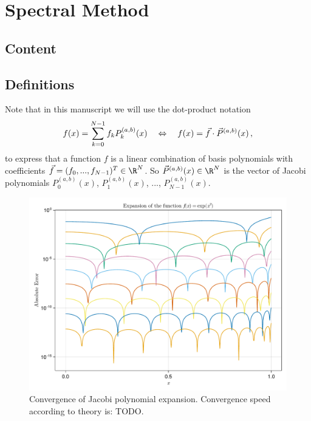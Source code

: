 \chapter{Spectral Method}
\label{chap:spectral-method}

\section{Content}


\section{Definitions}













Note that in this manuscript we will use the dot-product notation
$$f(x) = \sum_{k=0}^{N-1} f_k P_k^{(a, b)}(x) \quad\Leftrightarrow\quad f(x) = \vec{f} \cdot \vec{P}^{(a, b)}(x)\,,$$
to express that a function $f$ is a linear combination of basis polynomials with coefficients $\vec{f} = (f_0, ..., f_{N-1})^T \in \R^N$.
So $\vec{P}^{(a, b)}(x) \in \R^N$ is the vector of Jacobi polynomials $P^{(a, b)}_0(x)$, $P^{(a, b)}_1(x)$, ..., $P^{(a, b)}_{N-1}(x)$.

\begin{figure}[H]
  \centering
  \label{fig:jacobi-expansions-error}
  \includegraphics[width=0.7\linewidth]{../figures/results/jacobi-expansions.pdf}
  \caption{Convergence of Jacobi polynomial expansion. Convergence speed according to theory is: TODO.}
\end{figure}

